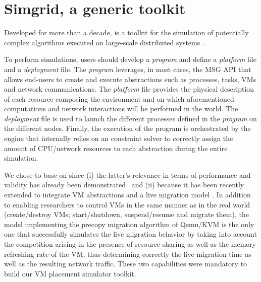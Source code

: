\section{Simgrid, a generic toolkit}
\label{sec:sg}

Developed for more than a decade,
\sg is a toolkit for the simulation of potentially complex algorithms
executed on large-scale distributed
systems~\cite{casanova:hal-01017319}.

To perform simulations, users should develop a \emph{program} and
define a \emph{platform} file and a \emph{deployment} file. The
\emph{program} leverages, in most cases, the \sg MSG API that allows
end-users to create and execute \sg abstractions such as processes,
tasks, VMs and network communications. The \emph{platform} file
provides the physical description of each resource composing the
environment and on which aforementioned computations and network
interactions will be performed in the \sg world.
The \emph{deployment} file is used to launch the different \sg
processes defined in the \emph{program} on the different nodes.
Finally, the execution of the program is orchestrated by the \sg
engine that internally relies on an constraint solver to correctly
assign the amount of CPU/network resources to each \sg abstraction
during the entire simulation.


We chose to base \vmps on \sg
since (i) the latter's relevance in terms of performance and validity
has already been demonstrated~\cite{simgridpub} and (ii) because it
has been recently extended to integrate VM abstractions and a live
migration model \cite{Hirofuchi:2013:ALM:2568486.2568524}. In addition
to enabling researchers to control VMs in the same manner as in the
real world (\eg create/destroy VMs; start/shutdown, suspend/resume and
migrate them), the model implementing the precopy migration algorithm
of Qemu/KVM is the only one that successfully simulates the live
migration behavior by taking into account the competition arising in
the presence of resource sharing as well as the memory refreshing rate
of the VM, thus determining correctly the live migration time as well
as the resulting network traffic. These two capabilities were
mandatory to build our VM placement simulator toolkit.
